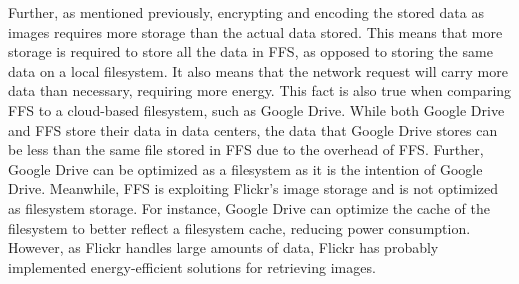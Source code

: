 Further, as mentioned previously, encrypting and encoding the stored data as images requires more storage than the actual data stored. This means that more storage is required to store all the data in \gls{FFS}, as opposed to storing the same data on a local filesystem. It also means that the network request will carry more data than necessary, requiring more energy. This fact is also true when comparing \gls{FFS} to a cloud-based filesystem, such as Google Drive. While both Google Drive and \gls{FFS} store their data in data centers, the data that Google Drive stores can be less than the same file stored in \gls{FFS} due to the overhead of \gls{FFS}. Further, Google Drive can be optimized as a filesystem as it is the intention of Google Drive. Meanwhile, \gls{FFS} is exploiting Flickr's image storage and is not optimized as filesystem storage. For instance, Google Drive can optimize the cache of the filesystem to better reflect a filesystem cache, reducing power consumption. However, as Flickr handles large amounts of data, Flickr has probably implemented energy-efficient solutions for retrieving images. 


